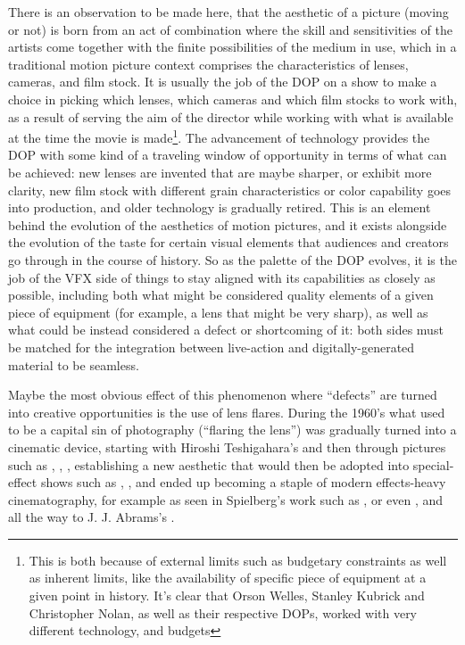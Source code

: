 There is an observation to be made here, that the aesthetic of a picture (moving or not) is born from
an act of combination where the skill and sensitivities of the artists come together with the 
finite possibilities of the medium in use, which in a traditional motion picture context comprises 
the characteristics of lenses, cameras, and film stock. 
It is usually the job of the \gls{DOP} on a show to make a choice in picking which lenses, which cameras 
and which film stocks to work with, as a result of serving the aim of the director while working with 
what is available at the time the movie is made\footnote{This is both because of external limits such as 
	budgetary constraints as well as inherent limits, like the availability of specific piece of equipment 
	at a given point in history. It's clear that Orson Welles, Stanley Kubrick and Christopher Nolan, 
	as well as their respective \glspl{DOP}, worked with very different technology, and budgets}. 
The advancement of technology provides the \gls{DOP} with some kind of a traveling 
window of opportunity in terms of what can be achieved: new lenses are invented that are maybe sharper,
or exhibit more clarity, new film stock with different grain characteristics or color capability goes into
production, and older technology is gradually retired.
This is an element behind the evolution of the aesthetics of motion pictures, and it exists alongside the
evolution of the taste for certain visual elements that audiences and creators go through in the course of
history.
So as the palette of the \gls{DOP} evolves, it is the job of the \gls{VFX} side of things to stay
aligned with its capabilities as closely as possible, including both what might be considered
quality elements of a given piece of equipment (for example, a lens that might be very sharp),
as well as what could be instead considered a defect or shortcoming of it: both sides must be
matched for the integration between live-action and digitally-generated material to be seamless. 

Maybe the most obvious effect of this phenomenon where ``defects'' are turned into creative opportunities is
the use of lens flares. 
During the 1960's what used to be a capital sin of photography (``flaring the lens'') was gradually
turned into a cinematic device, starting with Hiroshi Teshigahara's \cite{teshigahara64} and then through pictures 
such as \cite{graduate67}, \cite{easyrider69}, \cite{fiveeasypieces70}, 
establishing a new aesthetic that would then be adopted into special-effect shows such as \cite{spaceodyssey68}, 
\cite{starwars77}, \cite{closeencounters77} and ended up becoming a staple of modern effects-heavy 
cinematography, for example as seen in Spielberg's work such as \cite{raiders81}, \cite{et82} or even
\cite{goonies85}, and all the way to J. J. Abrams's \cite{startrek2013}.

